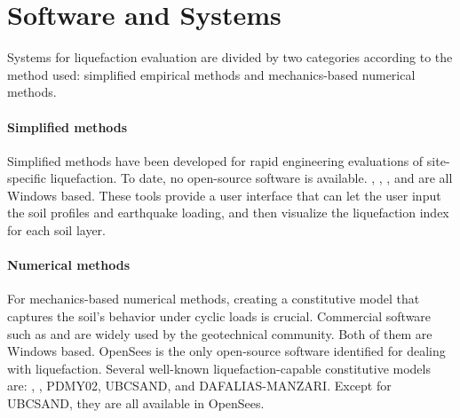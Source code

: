 \section{Software and Systems}
\label{sec:eq_liq_tools}

Systems for liquefaction evaluation are divided by two categories according to the method used: simplified empirical methods and mechanics-based numerical methods.

\paragraph{Simplified methods}
Simplified methods have been developed for rapid engineering evaluations of site-specific liquefaction. To date, no open-source software is available. , , , and  are all Windows based. These tools provide a user interface that can let the user input the soil profiles and earthquake loading, and then visualize the liquefaction index for each soil layer.

\paragraph{Numerical methods}
For mechanics-based numerical methods, creating a constitutive model that captures the soil's behavior under cyclic loads is crucial. Commercial software such as  and  are widely used by the geotechnical community. Both of them are Windows based. OpenSees is the only open-source software identified for dealing with liquefaction. Several well-known liquefaction-capable constitutive models are: , , PDMY02, UBCSAND, and DAFALIAS-MANZARI. Except for UBCSAND, they are all available in OpenSees.
